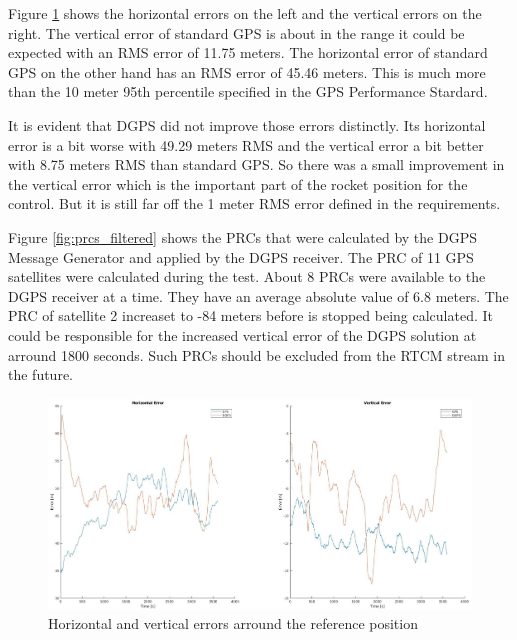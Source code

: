 Figure \ref{fig:horizontal_vertical_error} shows the horizontal errors on the left and the vertical errors on the right.
The vertical error of standard GPS is about in the range it could be expected with an RMS error of 11.75 meters.
The horizontal error of standard GPS on the other hand has an RMS error of 45.46 meters.
This is much more than the 10 meter 95th percentile specified in the GPS Performance Stardard.

It is evident that DGPS did not improve those errors distinctly.
Its horizontal error is a bit worse with 49.29 meters RMS and the vertical error a bit better with 8.75 meters RMS than standard GPS.
So there was a small improvement in the vertical error which is the important part of the rocket position for the control.
But it is still far off the 1 meter RMS error defined in the requirements.

Figure \ref{fig:prcs_filtered} shows the PRCs that were calculated by the DGPS Message Generator and applied by the DGPS receiver.
The PRC of 11 GPS satellites were calculated during the test.
About 8 PRCs were available to the DGPS receiver at a time.
They have an average absolute value of 6.8 meters.
The PRC of satellite 2 increaset to -84 meters before is stopped being calculated.
It could be responsible for the increased vertical error of the DGPS solution at arround 1800 seconds.
Such PRCs should be excluded from the RTCM stream in the future.

\begin{figure}[!h]
 \centering
 \includegraphics[height=0.4\textheight]{images/Horizontal_Vertical_Error.jpg}
 \caption{Horizontal and vertical errors arround the reference position}
 \label{fig:horizontal_vertical_error}
\end{figure}

